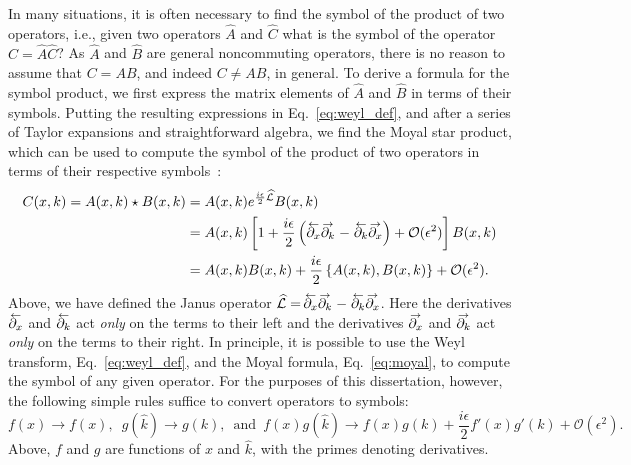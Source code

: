 \begin{subappendices}
In many situations, it is often necessary to find the symbol of the product of two operators, i.e., given two operators $\widehat{A}$ and $\widehat{C}$ what is the symbol of the operator $\widehat{C} = \widehat{A}\widehat{C}$?
As $\widehat{A}$ and $\widehat{B}$ are general noncommuting operators, there is no reason to assume that $C = AB$, and indeed $C \neq AB$, in general.
To derive a formula for the symbol product, we first express the matrix elements of $\widehat{A}$ and $\widehat{B}$ in terms of their symbols.
Putting the resulting expressions in Eq.~\eqref{eq:weyl_def}, and after a series of Taylor expansions and straightforward algebra, we find the Moyal star product, which can be used to compute the symbol of the product of two operators in terms of their respective symbols~\cite{chaichian2001}:
%
\begin{equation}
  \begin{aligned}
    C(x, k) = A(x, k)\star B(x, k) &= A(x, k)e^{\frac{i\epsilon}{2}\widehat{\mathcal{L}}} B(x, k)\\
                                                             &= A(x, k)\left[1 + \frac{i\epsilon}{2}\left(\ogets{\partial_{x}}\oto{\partial_{k}} - \ogets{\partial_{k}}\oto{\partial_{x}}\right) + \mathcal{O}(\epsilon^{2}) \right] B(x, k)\\
                                                             &= A(x, k)B(x, k) + \frac{i\epsilon}{2}\left\{A(x, k), B(x, k)\right\} + \mathcal{O}(\epsilon^{2}).
  \end{aligned}
  \label{eq:moyal}
\end{equation}
%
Above, we have defined the Janus operator $\widehat{\mathcal{L}}=\,\ogets{\partial_{x}} \oto{\partial_{k}} - \ogets{\partial_{k}}\oto{\partial_{x}}$.
Here the derivatives $\ogets{\partial_{x}}$ and $\ogets{\partial_{k}}$ act \emph{only} on the terms to their left and the derivatives $\oto{\partial_{x}}$ and $\oto{\partial_{k}}$ act \emph{only} on the terms to their right.
In principle, it is possible to use the Weyl transform, Eq.~\eqref{eq:weyl_def}, and the Moyal formula, Eq.~\eqref{eq:moyal}, to compute the symbol of any given operator.
For the purposes of this dissertation, however, the following simple rules suffice to convert operators to symbols:
%
\begin{equation}
  f(x) \to f(x),\enspace
  g(\hat{k}) \to g(k),\enspace\text{and}\enspace
  f(x)g(\hat{k}) \to f(x)g(k) + \frac{i\epsilon}{2}f'(x)g'(k) + \mathcal{O}(\epsilon^{2}).
  \label{eq:weylrules}
\end{equation}
%
Above, $f$ and $g$ are functions of $x$ and $\hat{k}$, with the primes denoting derivatives.

\end{subappendices}
